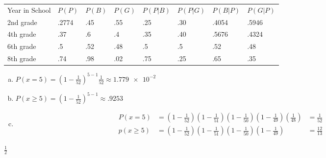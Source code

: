 \documentclass[12pt]{article}
\newenvironment{problem}[2][Problem]{\begin{trivlist}
\item[\hskip \labelsep {\bfseries #1}\hskip \labelsep {\bfseries #2.}]
  \vspace{1 cm}
}{\end{trivlist}}
\begin{document}
\begin{problem}{2.49}
\item
  \begin{table}[!htbp]
    \centering
    \begin{tabular}{llllllll}
      Year in School & $P(P)$ & $P(B)$ & $P(G)$ & $P(P|B)$ & $P(P|G)$ & $P(B|P)$ & $P(G|P)$ \\
      2nd grade      & .2774  & .45    & .55    & .25      & .30      & .4054    & .5946    \\
      4th grade      & .37    & .6     & .4     & .35      & .40      & .5676    & .4324    \\
      6th grade      & .5     & .52    & .48    & .5       & .5       & .52      & .48      \\
      8th grade      & .74    & .98    & .02    & .75      & .25      & .65      & .35     
    \end{tabular}
  \end{table}
\end{problem}

\begin{problem}{2.51}
\item
  \begin{enumerate}[a.]
    \item %
      $P(x=5) = (1-\frac{1}{52})^{5-1} \frac{1}{52} \approx \num{1.779e-2}$
    \item %
      $P(x\geq5) = (1-\frac{1}{52})^{5-1} \approx .9253$
    \item %
      \begin{align*}
        P(x=5)
        &= (1-\frac{1}{52})(1-\frac{1}{51})(1-\frac{1}{50})(1-\frac{1}{49})(\frac{1}{48})
        &= \frac{1}{52} \\
        p(x\geq5) 
        &=(1-\frac{1}{52})(1-\frac{1}{51})(1-\frac{1}{50})(1-\frac{1}{49})
        &= \frac{12}{13}
      \end{align*}
  \end{enumerate}
\end{problem}

\begin{problem}{2.53}
\item
  $\frac{1}{2}$
\end{problem}
\end{document}
